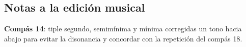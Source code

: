 \subsection*{Notas a la edición musical}

\noindent \textbf{Compás 14}: tiple segundo, semimínima y mínima corregidas un tono hacia abajo para evitar la disonancia y concordar con la repetición del compás 18. 
